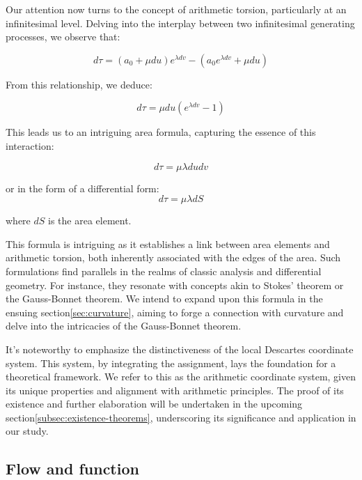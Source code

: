 Our attention now turns to the concept of arithmetic torsion, particularly at an infinitesimal level. Delving into the interplay between two infinitesimal generating processes, we observe that:

\begin{equation}
    d\tau = (a_0 + \mu du) e^{\lambda dv} - (a_0 e^{\lambda dv} + \mu du)
\end{equation}

From this relationship, we deduce:

\begin{equation}
    d\tau = \mu du (e^{\lambda dv} - 1)
\end{equation}

This leads us to an intriguing area formula, capturing the essence of this interaction:

\begin{equation}
    d\tau = \mu \lambda du dv \label{eq:area_formula}
\end{equation}

or in the form of a differential form:
\begin{equation}
    d\tau = \mu \lambda dS \label{eq:area_formula2}
\end{equation}

where $dS$ is the area element.

This formula is intriguing as it establishes a link between area elements and arithmetic torsion,
both inherently associated with the edges of the area. Such formulations find parallels in the realms of classic analysis and differential geometry.
For instance, they resonate with concepts akin to Stokes' theorem or the Gauss-Bonnet theorem.
We intend to expand upon this formula in the ensuing section\ref{sec:curvature},
aiming to forge a connection with curvature and delve into the intricacies of the Gauss-Bonnet theorem.

It's noteworthy to emphasize the distinctiveness of the local Descartes coordinate system.
This system, by integrating the assignment, lays the foundation for a theoretical framework.
We refer to this as the arithmetic coordinate system, given its unique properties and alignment with arithmetic principles.
The proof of its existence and further elaboration will be undertaken in the upcoming section\ref{subsec:existence-theorems},
underscoring its significance and application in our study.

\subsection{Flow and function}\label{subsec:flow-and-function}

